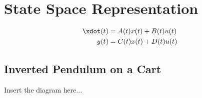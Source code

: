 \documentclass[10pt]{article}
\title{}
\author{}
\date{Aug. 28, 2014}
\begin{document}
\maketitle


\section{State Space Representation}
\begin{align}
  \xdot(t) &= A(t) x(t) + B(t)u(t)\\
  y(t)     &= C(t) x(t) + D(t)u(t)
\end{align}

\subsection{Inverted Pendulum on a Cart}

Insert the diagram here...
\end{document}
